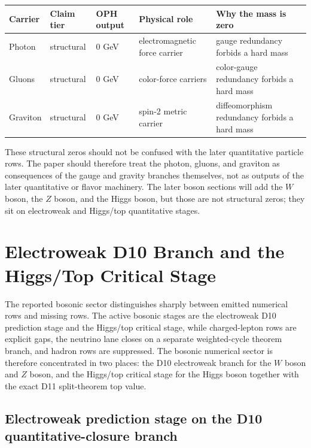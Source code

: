 \documentclass[11pt]{article}
\begin{document}
\begin{table}[h]
\centering
\small
\begin{tabular}{@{}>{\raggedright\arraybackslash}p{}>{\raggedright\arraybackslash}p{}>{\raggedright\arraybackslash}p{}>{\raggedright\arraybackslash}p{}>{\raggedright\arraybackslash}p{}@{}}
\toprule
Carrier & Claim tier & OPH output & Physical role & Why the mass is zero \\
\midrule
Photon & structural & \(0\) GeV & electromagnetic force carrier & gauge redundancy forbids a hard mass \\
Gluons & structural & \(0\) GeV & color-force carriers & color-gauge redundancy forbids a hard mass \\
Graviton & structural & \(0\) GeV & spin-2 metric carrier & diffeomorphism redundancy forbids a hard mass \\
\bottomrule
\end{tabular}
\end{table}

These structural zeros should not be confused with the later quantitative particle rows. The
paper should therefore treat the photon, gluons, and graviton as consequences of the
gauge and gravity branches themselves, not as outputs of the later quantitative or flavor
machinery. The later boson sections will add the \(W\) boson, the \(Z\) boson, and the Higgs
boson, but those are not structural zeros; they sit on electroweak and Higgs/top quantitative stages.

\section{Electroweak D10 Branch and the Higgs/Top Critical Stage}

The reported bosonic sector distinguishes sharply between emitted numerical rows and
missing rows. The active bosonic stages are the electroweak
D10 prediction stage and the Higgs/top critical stage, while charged-lepton rows
are explicit gaps, the neutrino lane closes on a separate weighted-cycle theorem branch, and hadron rows are suppressed. The bosonic numerical
sector is therefore concentrated in two places: the D10 electroweak branch for the \(W\) boson and \(Z\) boson, and
the Higgs/top critical stage for the Higgs boson together with the exact D11 split-theorem top value.

\subsection{Electroweak prediction stage on the D10 quantitative-closure branch}
\end{document}
